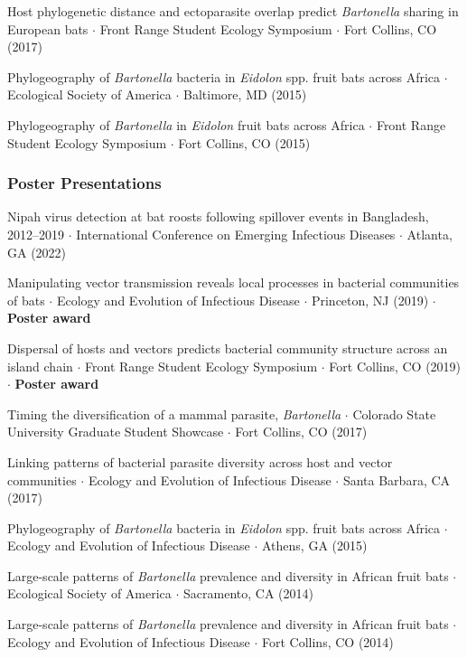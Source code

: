 \documentclass{cv}
\begin{document}
Host phylogenetic distance and ectoparasite overlap predict \textit{Bartonella} sharing in European bats $\cdot$ Front Range Student Ecology Symposium $\cdot$ Fort Collins, CO (2017)

Phylogeography of \textit{Bartonella} bacteria in \textit{Eidolon} spp. fruit bats across Africa $\cdot$ Ecological Society of America $\cdot$ Baltimore, MD (2015)

Phylogeography of \textit{Bartonella} in \textit{Eidolon} fruit bats across Africa $\cdot$ Front Range Student Ecology Symposium $\cdot$ Fort Collins, CO (2015)

\subsubsection*{Poster Presentations}

Nipah virus detection at bat roosts following spillover events in Bangladesh, 2012–2019 $\cdot$ International Conference on Emerging Infectious Diseases $\cdot$ Atlanta, GA (2022)

Manipulating vector transmission reveals local processes in bacterial communities of bats $\cdot$ Ecology and Evolution of Infectious Disease $\cdot$ Princeton, NJ (2019) $\cdot$ \textbf{Poster award}

Dispersal of hosts and vectors predicts bacterial community structure across an island chain $\cdot$ Front Range Student Ecology Symposium $\cdot$ Fort Collins, CO (2019) $\cdot$ \textbf{Poster award}

Timing the diversification of a mammal parasite, \textit{Bartonella} $\cdot$ Colorado State University Graduate Student Showcase $\cdot$ Fort Collins, CO (2017)

Linking patterns of bacterial parasite diversity across host and vector communities $\cdot$ Ecology and Evolution of Infectious Disease $\cdot$ Santa Barbara, CA (2017)

Phylogeography of \textit{Bartonella} bacteria in \textit{Eidolon} spp. fruit bats across Africa $\cdot$ Ecology and Evolution of Infectious Disease $\cdot$ Athens, GA (2015)

Large-scale patterns of \textit{Bartonella} prevalence and diversity in African fruit bats $\cdot$ Ecological Society of America $\cdot$ Sacramento, CA (2014)

Large-scale patterns of \textit{Bartonella} prevalence and diversity in African fruit bats $\cdot$ Ecology and Evolution of Infectious Disease $\cdot$ Fort Collins, CO (2014)
\end{document}
